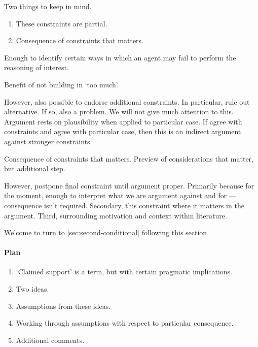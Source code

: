 \begin{note}
  Two things to keep in mind.

  \begin{enumerate}
  \item These constraints are partial.
  \item Consequence of constraints that matters.
  \end{enumerate}

  Enough to identify certain ways in which an agent may fail to perform the reasoning of interest.

  Benefit of not building in `too much'.

  However, also possible to endorse additional constraints.
  In particular, rule out alternative.
  If so, also a problem.
  We will not give much attention to this.
  Argument rests on plausibility when applied to particular case.
  If agree with constraints and agree with particular case, then this is an indirect argument against stronger constraints.


  Consequence of constraints that matters.
  Preview of considerations that matter, but additional step.

  However, postpone final constraint until argument proper.
  Primarily because for the moment, enough to interpret what we are argument against and for --- consequence isn't required.
  Secondary, this constraint where it matters in the argument.
  Third, surrounding motivation and context within literature.

  Welcome to turn to \autoref{sec:second-conditional} following this section.
\end{note}

\paragraph*{Plan}

\begin{note}
  \begin{enumerate}
  \item `Claimed support' is a term, but with certain pragmatic implications.
  \item Two ideas.
  \item Assumptions from these ideas.
  \item Working through assumptions with respect to particular consequence.
  \item Additional comments.
  \end{enumerate}
\end{note}


